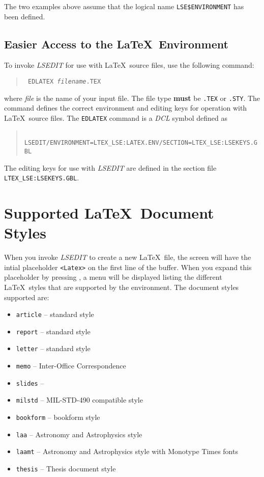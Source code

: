 The two examples above assume that the logical name \verb|LSE$ENVIRONMENT| has
been defined.  

\subsection{Easier Access to the \LaTeX\ Environment}

To invoke {\sl LSEDIT\/} for use with \LaTeX\ source files, use the 
following command:
\begin{quote}
\tt
\prompt{} EDLATEX {\it filename\/}.TEX \hfill
\end{quote}

where {\it file\/} is the name of your input file.  The file type {\bf must} be
{\tt .TEX} or {\tt .STY}. The command defines the correct environment and
editing keys for operation with \LaTeX\ source files. 
The {\tt EDLATEX} command is a {\sl DCL\/} symbol defined as

\begin{quote}
\tt
LSEDIT/ENVIRONMENT=LTEX\_LSE:LATEX.ENV/SECTION=LTEX\_LSE:LSEKEYS.GBL \hfill
\end{quote}

The editing keys for use with {\sl LSEDIT\/} are defined in the
section file {\tt LTEX\_LSE:LSEKEYS.GBL}. 

\section{Supported \LaTeX\ Document Styles}

When you invoke {\sl LSEDIT\/} to create a new \LaTeX\ file, the screen will
have the intial placeholder \verb"<Latex>" on the first line of the buffer.
When you expand this placeholder by pressing , a menu will be displayed
listing the different \LaTeX\ styles that are supported by the environment. 
The document styles supported are: 

\begin{itemize}
\item {\tt article} -- standard style 
\item {\tt report} -- standard style
\item {\tt letter} -- standard style
\item {\tt memo} -- Inter-Office Correspondence
\item {\tt slides} -- \SLiTeX{}
\item {\tt milstd} -- MIL-STD-490 compatible style
\item {\tt bookform} -- bookform style
\item {\tt laa} -- Astronomy and Astrophysics style
\item {\tt laamt} -- Astronomy and Astrophysics style with Monotype Times fonts
\item {\tt thesis} -- Thesis document style
\end{itemize}

